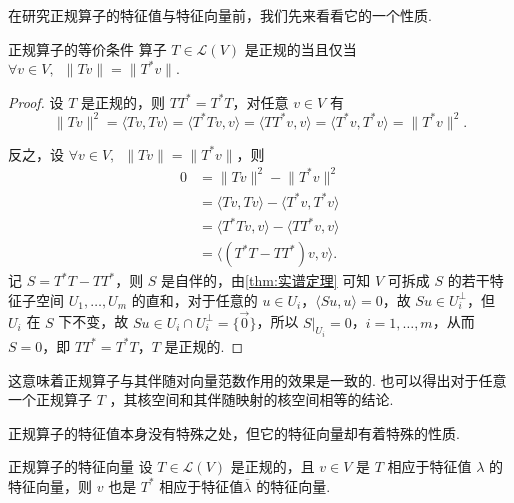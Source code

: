 在研究正规算子的特征值与特征向量前，我们先来看看它的一个性质.

\begin{theorem}{}{正规算子的等价条件}
    算子 $ T \in \mathcal{L}(V) $ 是正规的当且仅当 $ \forall v \in V,\enspace \lVert Tv \rVert = \lVert T^*v \rVert $.
\end{theorem}

\begin{proof}
    设 $ T $ 是正规的，则 $ TT^* = T^*T $，对任意 $ v \in V $ 有
    \[
    \lVert Tv \rVert^2 = \langle Tv, Tv \rangle = \langle T^*Tv, v \rangle = \langle TT^*v, v \rangle = \langle T^*v, T^*v \rangle = \lVert T^*v \rVert^2.
    \]

    反之，设 $ \forall v \in V,\enspace \lVert Tv \rVert = \lVert T^*v \rVert $，则
    \begin{align*}
        0 & = \lVert Tv \rVert^2 - \lVert T^*v \rVert^2               \\
          & = \langle Tv, Tv \rangle - \langle T^*v, T^*v \rangle     \\
          & = \langle T^*Tv, v \rangle - \langle TT^*v, v \rangle     \\
          & = \langle (T^*T - TT^*)v, v \rangle.
    \end{align*}
    记 $ S = T^*T - TT^* $，则 $S$ 是自伴的，由\autoref{thm:实谱定理} 可知 $V$ 可拆成 $S$ 的若干特征子空间 $U_1,\ldots,U_m$ 的直和，对于任意的 $u \in U_i$，$\langle Su, u \rangle = 0$，故 $Su \in U_i^{\perp}$，但 $U_i$ 在 $S$ 下不变，故 $Su \in U_i \cap U_i^{\perp} = \{\vec{0}\}$，所以 $S\vert_{U_i} = 0$，$ i = 1, \ldots, m $，从而 $ S = 0 $，即 $ TT^* = T^*T $，$ T $ 是正规的.
\end{proof}

这意味着正规算子与其伴随对向量范数作用的效果是一致的. 也可以得出对于任意一个正规算子 $ T $ ，其核空间和其伴随映射的核空间相等的结论.

正规算子的特征值本身没有特殊之处，但它的特征向量却有着特殊的性质.

\begin{theorem}{}{正规算子的特征向量}
    设 $ T \in \mathcal{L}(V) $ 是正规的，且 $ v \in V $ 是 $ T $ 相应于特征值 $ \lambda $ 的特征向量，则 $ v $ 也是 $ T^* $ 相应于特征值$ \overline{\lambda} $ 的特征向量.
\end{theorem}

